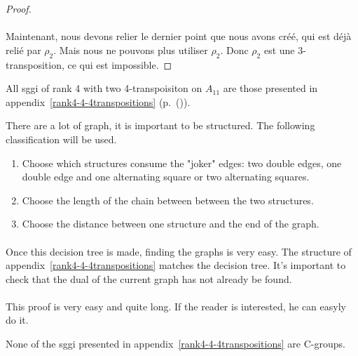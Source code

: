\begin{proof}
  \paragraph{}
  Maintenant, nous devons relier le dernier point que nous avons créé, qui est déjà relié par $\rho_2$. Mais nous ne pouvons plus utiliser $\rho_2$. Donc $\rho_2$ est une 3-transposition, ce qui est impossible.

\end{proof}

\begin{theorem}
  All sggi of rank 4 with two 4-transpoisiton on $A_{11}$ are those presented in appendix~\ref{rank4-4-4transpositions} (p.~\pageref(\label{rank4-4-4transpositions})).
\end{theorem}

There are a lot of graph, it is important to be structured. The following classification will be used.

\begin{enumerate}
  \item Choose which structures consume the "joker" edges: two double edges, one double edge and one alternating square or two alternating squares.
  \item Choose the length of the chain between between the two structures.
  \item Choose the distance between one structure and the end of the graph.
\end{enumerate}

\paragraph{}
Once this decision tree is made, finding the graphs is very easy. The structure of appendix~\ref{rank4-4-4transpositions} matches the decision tree. It's important to check that the dual of the current graph has not already be found.

\paragraph{}
This proof is very easy and quite long. If the reader is interested, he can easyly do it.

\begin{theorem}
  None of the sggi presented in appendix~\ref{rank4-4-4transpositions} are C-groups.
\end{theorem}

